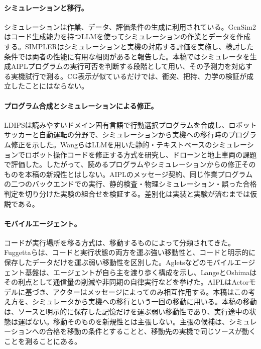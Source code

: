 \documentclass[10pt,letterpaper]{article}
\begin{document}
\paragraph{シミュレーションと移行。}シミュレーションは作業、データ、評価条件の生成に利用されている。GenSim2はコード生成能力を持つLLMを使ってシミュレーションの作業とデータを作成する\cite{hua2025}。SIMPLERはシミュレーションと実機の対応する評価を実施し、検討した条件では両者の性能に有用な相関があると報告した\cite{li2025}。本稿ではシミュレータを生成AIPLプログラムの実行可否を判断する段階として用い、その予測力を対応する実機試行で測る。CG表示が似ているだけでは、衝突、把持、力学の検証が成立したことにはならない。

\paragraph{プログラム合成とシミュレーションによる修正。}LDIPSは読みやすいドメイン固有言語で行動選択プログラムを合成し、ロボットサッカーと自動運転の分野で、シミュレーションから実機への移行時のプログラム修正を示した\cite{holtz2021}。WangらはLLMを用いた静的・テキストベースのシミュレーションでロボット操作コードを修正する方式を研究し、ドローンと地上車両の課題で評価した\cite{wang2025}。したがって、読めるプログラムやシミュレーションからの修正そのものを本稿の新規性とはしない。AIPLのメッセージ契約、同じ作業プログラムの二つのバックエンドでの実行、静的検査・物理シミュレーション・誤った合格判定を切り分けた実験の組合せを検証する。差別化は実装と実験が済むまでは仮説である。

\paragraph{モバイルエージェント。}コードが実行場所を移る方式は、移動するものによって分類されてきた。Fuggettaらは、コードと実行状態の両方を運ぶ強い移動性と、コードと明示的に保存したデータだけを運ぶ弱い移動性を区別した\cite{fuggetta1998}。Aglets\cite{lange1998book}などのモバイルエージェント基盤は、エージェントが自ら主を渡り歩く構成を示し、LangeとOshimaはその利点として通信量の削減や非同期の自律実行などを挙げた\cite{lange1999}。AIPLはActorモデル\cite{agha1986}に基づき、アクターはメッセージによってのみ相互作用する。本稿はこの考え方を、シミュレータから実機への移行という一回の移動に用いる。本稿の移動は、ソースと明示的に保存した記憶だけを運ぶ弱い移動性であり、実行途中の状態は運ばない。移動そのものを新規性とは主張しない。主張の候補は、シミュレーションへの合格を移動の条件とすることと、移動先の実機で同じソースが動くことを測ることにある。
\end{document}
